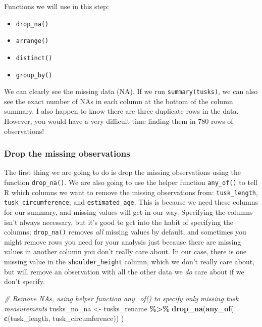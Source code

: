 \documentclass[
]{article}
\newenvironment{Shaded}{\begin{snugshade}}{\end{snugshade}}
\newcommand{\CommentTok}[1]{\textcolor[rgb]{0.56,0.35,0.01}{\textit{#1}}}
\newcommand{\FunctionTok}[1]{\textcolor[rgb]{0.13,0.29,0.53}{\textbf{#1}}}
\newcommand{\NormalTok}[1]{#1}
\newcommand{\OtherTok}[1]{\textcolor[rgb]{0.56,0.35,0.01}{#1}}
\newcommand{\SpecialCharTok}[1]{\textcolor[rgb]{0.81,0.36,0.00}{\textbf{#1}}}
\newcommand{\StringTok}[1]{\textcolor[rgb]{0.31,0.60,0.02}{#1}}
\providecommand{\tightlist}{%
  \setlength{\itemsep}{0pt}\setlength{\parskip}{0pt}}
\begin{document}
Functions we will use in this step:

\begin{itemize}
\tightlist
\item
  \texttt{drop\_na()}
\item
  \texttt{arrange()}
\item
  \texttt{distinct()}
\item
  \texttt{group\_by()}
\end{itemize}

We can clearly see the missing data (NA). If we run
\texttt{summary(tusks)}, we can also see the exact number of NAs in each
column at the bottom of the column summary. I also happen to know there
are three duplicate rows in the data. However, you would have a very
difficult time finding them in 780 rows of observations!

\subsubsection{Drop the missing
observations}\label{drop-the-missing-observations}

The first thing we are going to do is drop the missing observations
using the function \texttt{drop\_na()}. We are also going to use the
helper function \texttt{any\_of()} to tell R which columns we want to
remove the missing observations from: \texttt{tusk\_length},
\texttt{tusk\_circumference}, and \texttt{estimated\_age}. This is
because we need these columns for our summary, and missing values will
get in our way. Specifying the columns isn't always necessary, but it's
good to get into the habit of specifying the columns;
\texttt{drop\_na()} removes \emph{all} missing values by default, and
sometimes you might remove rows you need for your analysis just because
there are missing values in another column you don't really care about.
In our case, there is one missing value in the \texttt{shoulder\_height}
column, which we don't really care about, but will remove an observation
with all the other data we \emph{do} care about if we don't specify.

\begin{Shaded}
\begin{Highlighting}[]
\CommentTok{\# Remove NAs, using helper function any\_of() to specify only missing tusk measurements}
\NormalTok{tusks\_no\_na }\OtherTok{\textless{}{-}}\NormalTok{ tusks\_rename }\SpecialCharTok{\%\textgreater{}\%}
  \FunctionTok{drop\_na}\NormalTok{(}\FunctionTok{any\_of}\NormalTok{(}
    \FunctionTok{c}\NormalTok{(}\StringTok{\textquotesingle{}tusk\_length\textquotesingle{}}\NormalTok{, }\StringTok{\textquotesingle{}tusk\_circumference\textquotesingle{}}\NormalTok{))}
\NormalTok{  )}
\end{Highlighting}
\end{Shaded}
\end{document}
